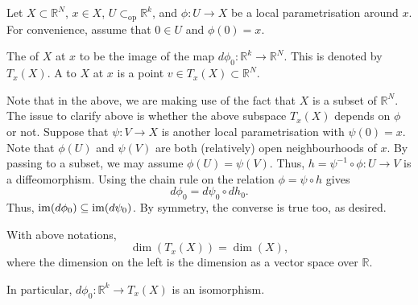 \documentclass[12pt]{article}
\newcommand{\opsub}{\subset_{\operatorname{op}}}
\begin{document}
\begin{defn}
	Let $X \subset \mathbb{R}^{N}$, $x \in X$, $U \opsub \mathbb{R}^{k}$, and $\phi : U \to X$ be a local parametrisation around $x$. For convenience, assume that $0 \in U$ and $\phi(0) = x$.

	The  of $X$ at $x$ to be the image of the map $d \phi_{0} : \mathbb{R}^{k} \to \mathbb{R}^{N}$. This is denoted by $T_{x}(X)$. \newline
	A  to $X$ at $x$ is a point $v \in T_{x}(X) \subset \mathbb{R}^{N}$.
\end{defn}

Note that in the above, we are making use of the fact that $X$ is a subset of $\mathbb{R}^{N}$. The issue to clarify above is whether the above subspace $T_{x}(X)$ depends on $\phi$ or not. Suppose that $\psi : V \to X$ is another local parametrisation with $\psi(0) = x$. Note that $\phi(U)$ and $\psi(V)$ are both (relatively) open neighbourhoods of $x$. By passing to a subset, we may assume $\phi(U) = \psi(V)$. Thus, $h = \psi^{-1} \circ \phi : U \to V$ is a diffeomorphism. Using the chain rule on the relation $\phi = \psi \circ h$ gives
\begin{equation*} 
	d \phi_{0} = d \psi_{0} \circ d h_{0}.
\end{equation*}
Thus, $\operatorname{im}(d \phi_{0}) \subseteq \operatorname{im}(d \psi_{0})$. By symmetry, the converse is true too, as desired.

\begin{thm}
	With above notations,
	\begin{equation*} 
		\boxed{\dim(T_{x}(X)) = \dim(X),}
	\end{equation*}
	where the dimension on the left is the dimension as a vector space over $\mathbb{R}$.

	In particular, $d\phi_{0} : \mathbb{R}^{k} \to T_{x}(X)$ is an isomorphism.
\end{thm}
\end{document}
